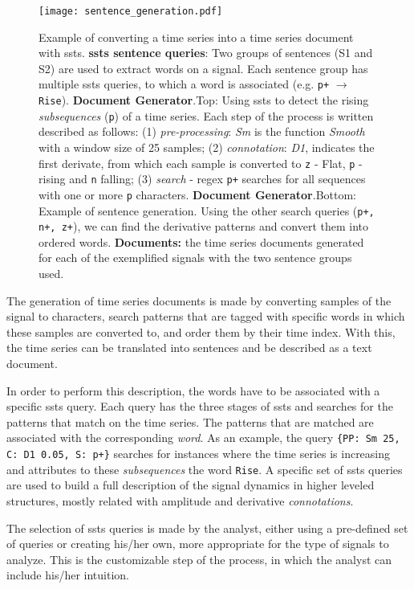 \begin{figure}[!h]
    \centering
    \texttt{[image: sentence\_generation.pdf]}
    \caption{Example of converting a time series into a time series document with \gls{ssts}. \textbf{\gls{ssts} sentence queries}: Two groups of sentences (S1 and S2) are used to extract words on a signal. Each sentence group has multiple \gls{ssts} queries, to which a word is associated (e.g. \texttt{p+} $\rightarrow$ \texttt{Rise}). \textbf{Document Generator}.Top: Using \gls{ssts} to detect the rising \textit{subsequences} (\texttt{p}) of a time series. Each step of the process is written described as follows: (1) \textit{pre-processing}: \textit{Sm} is the function \textit{Smooth} with a window size of 25 samples; (2) \textit{connotation}: \textit{D1}, indicates the first derivate, from which each sample is converted to \texttt{z} - Flat, \texttt{p} - rising and \texttt{n} falling; (3) \textit{search} - \gls{regex} \texttt{p+} searches for all sequences with one or more \texttt{p} characters. \textbf{Document Generator}.Bottom: Example of sentence generation. Using the other search queries (\texttt{p+, n+, z+}), we can find the derivative patterns and convert them into ordered words. \textbf{Documents:} the time series documents generated for each of the exemplified signals with the two sentence groups used.}
    \label{fig:SSTS_example}
\end{figure}

The generation of time series documents is made by converting samples of the signal to characters, search patterns that are tagged with specific words in which these samples are converted to, and order them by their time index. With this, the time series can be translated into sentences and be described as a text document.
\par
In order to perform this description, the words have to be associated with a specific \gls{ssts} query. Each query has the three stages of \gls{ssts} and searches for the patterns that match on the time series. The patterns that are matched are associated with the corresponding \textit{word}. As an example, the query \texttt{\{PP: Sm 25, C: D1 0.05, S: p+\}} searches for instances where the time series is increasing and attributes to these \textit{subsequences} the word \texttt{Rise}. A specific set of \gls{ssts} queries are used to build a full description of the signal dynamics in higher leveled structures, mostly related with amplitude and derivative \textit{connotations}. 

The selection of \gls{ssts} queries is made by the analyst, either using a pre-defined set of queries or creating his/her own, more appropriate for the type of signals to analyze. This is the customizable step of the process, in which the analyst can include his/her intuition.

